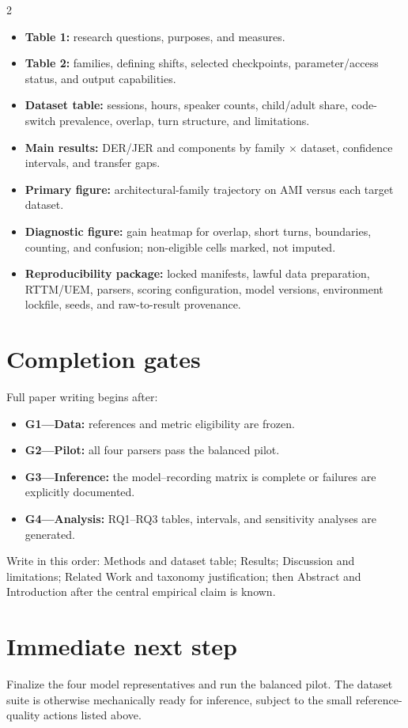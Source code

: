 \documentclass[9pt]{extarticle}
\begin{document}
\begin{multicols}{2}
\begin{itemize}
  \item \textbf{Table 1:} research questions, purposes, and measures.
  \item \textbf{Table 2:} families, defining shifts, selected checkpoints,
  parameter/access status, and output capabilities.
  \item \textbf{Dataset table:} sessions, hours, speaker counts, child/adult
  share, code-switch prevalence, overlap, turn structure, and limitations.
  \item \textbf{Main results:} DER/JER and components by family $\times$
  dataset, confidence intervals, and transfer gaps.
  \item \textbf{Primary figure:} architectural-family trajectory on AMI versus
  each target dataset.
  \item \textbf{Diagnostic figure:} gain heatmap for overlap, short turns,
  boundaries, counting, and confusion; non-eligible cells marked, not imputed.
  \item \textbf{Reproducibility package:} locked manifests, lawful data
  preparation, RTTM/UEM, parsers, scoring configuration, model versions,
  environment lockfile, seeds, and raw-to-result provenance.
\end{itemize}

\section*{Completion gates}

Full paper writing begins after:

\begin{itemize}
  \item \textbf{G1---Data:} references and metric eligibility are frozen.
  \item \textbf{G2---Pilot:} all four parsers pass the balanced pilot.
  \item \textbf{G3---Inference:} the model--recording matrix is complete or
  failures are explicitly documented.
  \item \textbf{G4---Analysis:} RQ1--RQ3 tables, intervals, and sensitivity
  analyses are generated.
\end{itemize}

Write in this order: Methods and dataset table; Results; Discussion and
limitations; Related Work and taxonomy justification; then Abstract and
Introduction after the central empirical claim is known.

\section*{Immediate next step}

Finalize the four model representatives and run the balanced pilot. The
dataset suite is otherwise mechanically ready for inference, subject to the
small reference-quality actions listed above.

\end{multicols}
\end{document}
